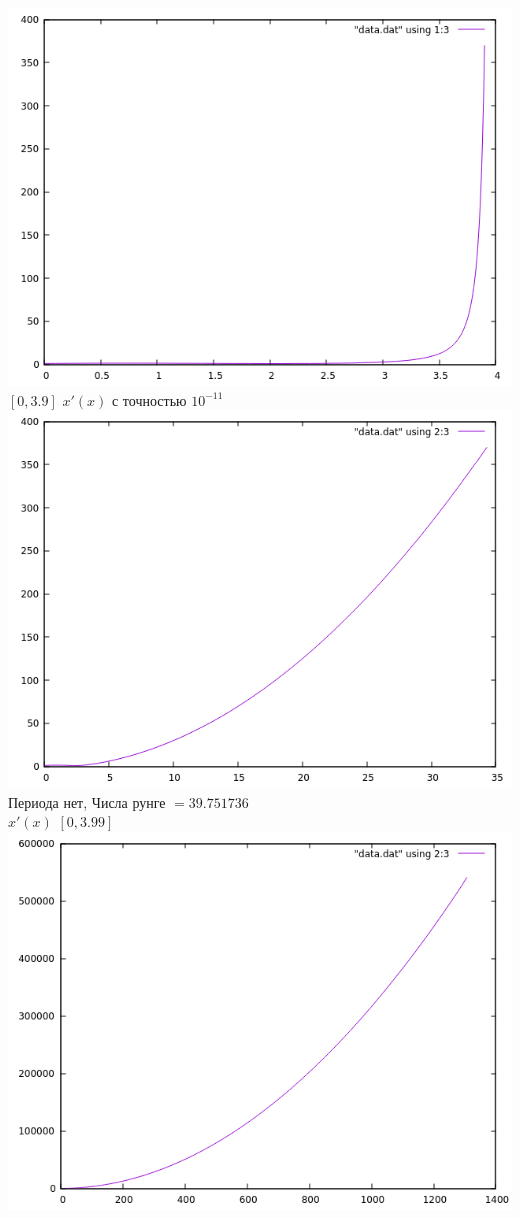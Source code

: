 \documentclass[12pt, a4paper] {report}
\theoremstyle{remark}
\theoremstyle{definition}
\begin{document}
\includegraphics[scale=1]{neshod13.png}\\
\newpage
$[0,3.9]$ $x'(x)$ с точностью $10^{-11}$\\
\includegraphics[scale=1]{neshod23.png}\\
\newpage Периода нет, Числа рунге $= 39.751736$ \\
 $x'(x)$ $[0, 3.99]$\\
\includegraphics[scale=1]{neshod232.png}\\
\newpage
\end{document}
